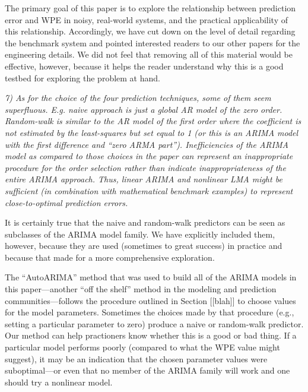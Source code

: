 \documentclass[12pt]{article}
\newcommand{\alert}[1]{{\color{red}#1}}
\begin{document}
The primary goal of this paper is to explore the relationship between
prediction error and WPE in noisy, real-world systems, and the
practical applicability of this relationship.  Accordingly, we have
cut down on the level of detail regarding the benchmark system and
pointed interested readers to our other papers for the engineering
details.  We did not feel that removing all of this material would
be effective, however, because it helps the reader understand why
this is a good testbed for exploring the problem at hand.

\smallskip

\emph{7) As for the choice of the four prediction techniques, some of
  them seem superfluous. E.g. naive approach is just a global AR model
  of the zero order.  Random-walk is similar to the AR model of the
  first order where the coefficient is not estimated by the
  least-squares but set equal to 1 (or this is an ARIMA model with the
  first difference and ``zero ARMA part''). Inefficiencies of the
  ARIMA model as compared to those choices in the paper can represent
  an inappropriate procedure for the order selection rather than
  indicate inappropriateness of the entire ARIMA approach. Thus,
  linear ARIMA and nonlinear LMA might be sufficient (in combination
  with mathematical benchmark examples) to represent close-to-optimal
  prediction errors.}

It is certainly true that the naive and random-walk predictors can be
seen as subclasses of the ARIMA model family.  We have explicitly
included them, however, because they are used (sometimes to great
success) in practice and because that made for a more comprehensive
exploration.

The ``AutoARIMA'' method that was used to build all of the ARIMA
models in this paper---another ``off the shelf'' method in the
modeling and prediction communities---follows the procedure outlined
in Section \alert{[[blah]]} to choose values for the model parameters.
Sometimes the choices made by that procedure (e.g., setting a
particular parameter to zero) produce a naive or random-walk
predictor.  Our method can help practioners know whether this is a
good or bad thing.  If a particular model performs poorly (compared to
what the WPE value might suggest), it may be an indication that the
chosen parameter values were suboptimal---or even that no member of
the ARIMA family will work and one should try a nonlinear model.

\end{document}
